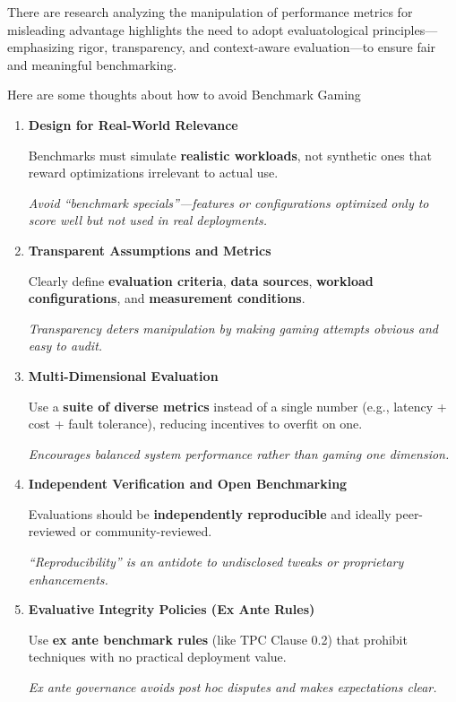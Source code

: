 There are research \cite{Jianfeng2024Evaluatology}  analyzing the manipulation of performance metrics for misleading advantage highlights the need to adopt evaluatological principles—emphasizing rigor, transparency, and context-aware evaluation—to ensure fair and meaningful benchmarking.

Here are some thoughts about how to avoid Benchmark Gaming

\begin{enumerate}
    \item \textbf{Design for Real-World Relevance}

 Benchmarks must simulate \textbf{realistic workloads}, not synthetic ones that reward optimizations irrelevant to actual use.

 \textit{Avoid “benchmark specials”—features or configurations optimized only to score well but not used in real deployments.}

    \item \textbf{Transparent Assumptions and Metrics}

 Clearly define \textbf{evaluation criteria}, \textbf{data sources}, \textbf{workload configurations}, and \textbf{measurement conditions}.

 \textit{Transparency deters manipulation by making gaming attempts obvious and easy to audit.}

    \item \textbf{Multi-Dimensional Evaluation}

 Use a \textbf{suite of diverse metrics} instead of a single number (e.g., latency + cost + fault tolerance), reducing incentives to overfit on one.

 \textit{Encourages balanced system performance rather than gaming one dimension.}

    \item \textbf{Independent Verification and Open Benchmarking}

 Evaluations should be \textbf{independently reproducible} and ideally peer-reviewed or community-reviewed.

 \textit{“Reproducibility” is an antidote to undisclosed tweaks or proprietary enhancements.}

    \item \textbf{Evaluative Integrity Policies (Ex Ante Rules)}

 Use \textbf{ex ante benchmark rules} (like TPC Clause 0.2) that prohibit techniques with no practical deployment value.

 \textit{Ex ante governance avoids post hoc disputes and makes expectations clear.}


\end{enumerate}
